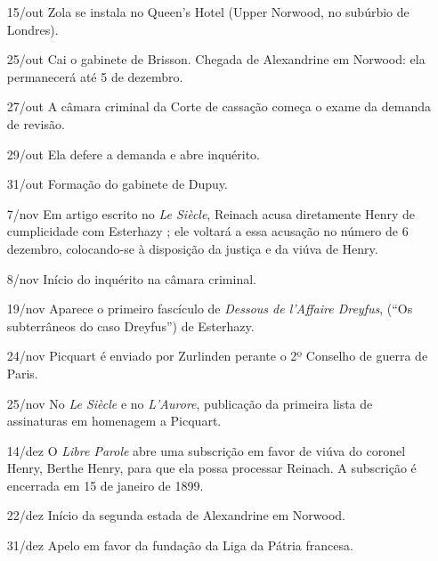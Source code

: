 \begin{itemize}
\item[15/out] Zola se instala no Queen's Hotel (Upper Norwood, no subúrbio de
Londres).

\item[25/out] Cai o gabinete de Brisson. Chegada de Alexandrine em Norwood: ela
permanecerá até 5 de dezembro.

\item[27/out] A câmara criminal da Corte de cassação começa o exame da demanda
de revisão.

\item[29/out] Ela defere a demanda e abre inquérito.

\item[31/out] Formação do gabinete de  Dupuy.

\item[7/nov] Em artigo escrito no \textit{Le Siècle}, Reinach acusa diretamente
Henry de cumplicidade com Esterhazy ; ele voltará a essa acusação no número de
6 dezembro, colocando-se à disposição da justiça e da viúva de Henry.

\item[8/nov] Início do inquérito na câmara criminal.

\item[19/nov] Aparece o primeiro fascículo de \textit{Dessous de l'Affaire
Dreyfus}, (``Os subterrâneos do caso Dreyfus'') de Esterhazy.

\item[24/nov] Picquart é enviado por Zurlinden perante o 2º Conselho de guerra
de Paris.

\item[25/nov] No \textit{Le Siècle} e no \textit{L'Aurore}, publicação da
primeira lista de assinaturas em homenagem a Picquart.

\item[14/dez] O \textit{Libre Parole} abre uma subscrição em favor de viúva do
coronel Henry, Berthe Henry, para que ela possa processar Reinach. A subscrição
é encerrada em 15 de janeiro de  1899.

\item[22/dez] Início da segunda estada de Alexandrine em Norwood.

\item[31/dez] Apelo em favor da fundação da Liga da Pátria francesa.
\end{itemize}

